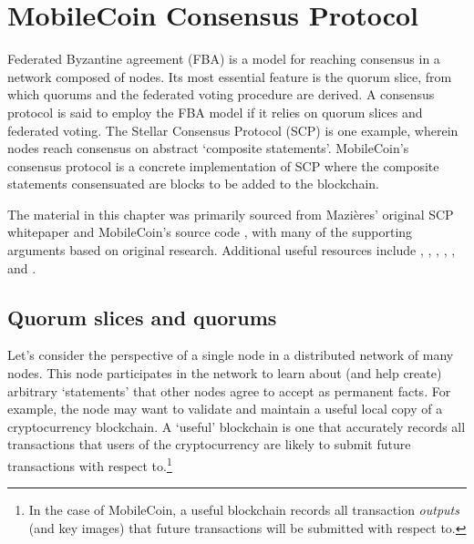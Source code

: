 \chapter{MobileCoin Consensus Protocol}
\label{chapter:consensus}

Federated Byzantine agreement (FBA) is a model for reaching consensus in a network composed of nodes. Its most essential feature is the quorum slice, from which quorums and the federated voting procedure are derived. A consensus protocol is said to employ the FBA model if it relies on quorum slices and federated voting. The Stellar Consensus Protocol (SCP) is one example, wherein nodes reach consensus on abstract `composite statements'. MobileCoin's consensus protocol is a concrete implementation of SCP where the composite statements consensuated are blocks to be added to the blockchain.

The material in this chapter was primarily sourced from Mazi{\`e}res' original SCP whitepaper \cite{stellar-consensus-protocol} and MobileCoin's source code \cite{mobilecoin-source-code}, with many of the supporting arguments based on original research. Additional useful resources include \cite{simplified-scp}, \cite{understanding-scp-glickstein}, \cite{fast-secure-global-payments-stellar}, \cite{safety-liveness-stellar}, \cite{scp-ietf-draft}, and \cite{stellar-instantiation}.



\section{Quorum slices and quorums}
\label{sec:consensus-quorum-slices-quorums}

Let's consider the perspective of a single node in a distributed network of many nodes. This node participates in the network to learn about (and help create) arbitrary `statements' that other nodes agree to accept as permanent facts. For example, the node may want to validate and maintain a useful local copy of a cryptocurrency blockchain. A `useful' blockchain is one that accurately records all transactions that users of the cryptocurrency are likely to submit future transactions with respect to.\footnote{In the case of MobileCoin, a useful blockchain records all transaction {\em outputs} (and key images) that future transactions will be submitted with respect to.}

